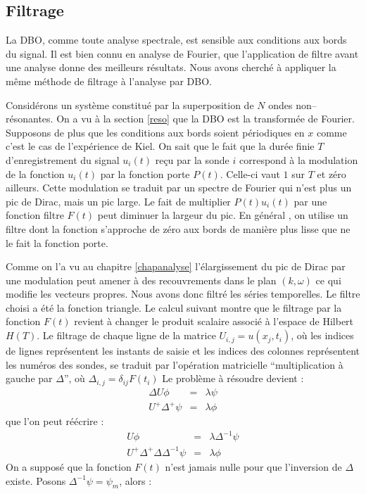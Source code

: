 \documentclass{book}
\begin{document}
\subsection{Filtrage}
La DBO, comme toute analyse spectrale, est sensible aux conditions aux
bords 
du signal.
Il est bien connu \cite{Press92} en analyse de Fourier, que l'application
de filtre avant une analyse donne des meilleurs r\'esultats.
Nous avons cherch\'e \`a appliquer la m\^eme m\'ethode
de filtrage \`a l'analyse par DBO.

Consid\'erons un syst\`eme constitu\'e par la superposition de $N$
ondes non--r\'esonantes.
On a vu \`a la section \ref{reso} que la DBO est la
transform\'ee de Fourier.
Supposons de plus que les conditions aux bords soient 
p\'eriodiques en $x$ comme c'est le cas de l'exp\'erience de
Kiel.
On sait que le fait que la dur\'ee finie $T$ d'enregistrement
du signal $u_i(t)$ re\c cu par la sonde $i$ 
correspond \`a la modulation
de la fonction $u_i(t)$ par la fonction porte $P(t)$.
Celle-ci vaut $1$ sur $T$ et z\'ero ailleurs.
Cette modulation se traduit par un spectre de Fourier
qui n'est plus un pic de Dirac, mais un pic large.
Le fait de multiplier $P(t)u_i(t)$ par une fonction filtre
$F(t)$ peut diminuer la largeur du pic. En g\'en\'eral
\cite{Press92}, on utilise un filtre dont la fonction
s'approche de z\'ero aux bords de mani\`ere plus lisse que ne le
fait la fonction porte.

Comme on l'a vu au chapitre \ref{chapanalyse} l'\'elargissement
du pic de Dirac par une modulation peut amener \`a des recouvrements
dans le plan $(k,\omega)$ ce qui modifie les vecteurs propres.
Nous avons donc filtr\'e les s\'eries temporelles.
Le filtre choisi a \'et\'e la fonction triangle.
Le calcul suivant montre que le filtrage par la fonction $F(t)$
revient \`a changer le produit scalaire associ\'e \`a l'espace de
Hilbert $H(T)$.
Le filtrage de chaque ligne de la matrice $U_{i,j}=u(x_j,t_i)$, o\`u
les indices de lignes repr\'esentent les instants de saisie  et les 
indices des colonnes repr\'esentent les num\'eros des sondes,
se traduit par l'op\'eration matricielle ``multiplication \`a gauche par 
$\Delta$'',  o\`u $\Delta_{i,j}=\delta_{i j}F(t_i)$
Le probl\`eme \`a r\'esoudre devient :
\begin{eqnarray}
\Delta U\phi&=&\lambda\psi\\
U^+\Delta^+ \psi&=&\lambda\phi
\end{eqnarray}
que l'on peut r\'e\'ecrire :
\begin{eqnarray}
U\phi&=&\lambda\Delta^{-1}\psi\\
U^+\Delta^+\Delta \Delta^{-1}\psi&=&\lambda\phi
\end{eqnarray}
On a suppos\'e que la fonction $F(t)$ n'est jamais nulle pour
que l'inversion de $\Delta$ existe.
Posons $\Delta^{-1}\psi=\psi_m$, alors :
\end{document}
